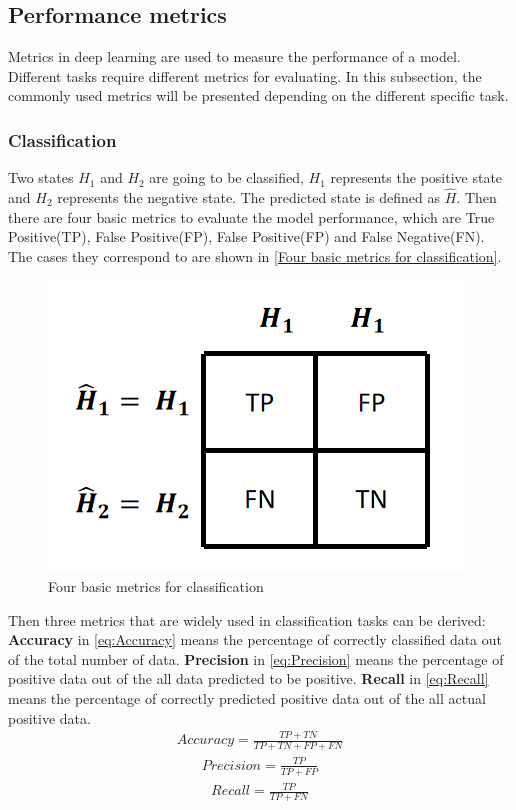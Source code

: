   \subsection{Performance metrics}
  Metrics in deep learning are used to measure the performance of a model. Different tasks require different metrics for evaluating. In this subsection, the commonly used metrics 
  will be presented depending on the different specific task.
  \subsubsection{Classification}
  Two states $H_1$ and $H_2$ are going to be classified, $H_1$ represents the positive state and  $H_2$ represents the negative state. The predicted state is defined as $\hat{H}$.
  Then there are four basic metrics to evaluate the model performance, which are True Positive(TP), False Positive(FP), False Positive(FP) and False Negative(FN).
  The cases they correspond to are shown in \autoref{Four basic metrics for classification}.
  \begin{figure}
    \centering
    \includegraphics[width=0.6\linewidth]{example_images/basicMetrics}
    \caption{Four basic metrics for classification}
    \label{Four basic metrics for classification}
  \end{figure}
  Then three metrics that are widely used in classification tasks can be derived: \textbf{Accuracy} in \autoref{eq:Accuracy} means the percentage of correctly classified data
  out of the total number of data. \textbf{Precision} in \autoref{eq:Precision} means the percentage of positive data out of the all data predicted to be positive. 
  \textbf{Recall} in \autoref{eq:Recall} means the percentage of correctly predicted positive data out of the all actual positive data.
  \begin{equation}
    \begin{aligned}
      Accuracy = \frac{TP + TN}{TP + TN + FP + FN}
        \label{eq:Accuracy}
    \end{aligned}
  \end{equation}
  \begin{equation}
    \begin{aligned}
      Precision = \frac{TP}{TP + FP}
        \label{eq:Precision}
    \end{aligned}
  \end{equation}
  \begin{equation}
    \begin{aligned}
      Recall = \frac{TP}{TP + FN}
        \label{eq:Recall}
    \end{aligned}
  \end{equation}
